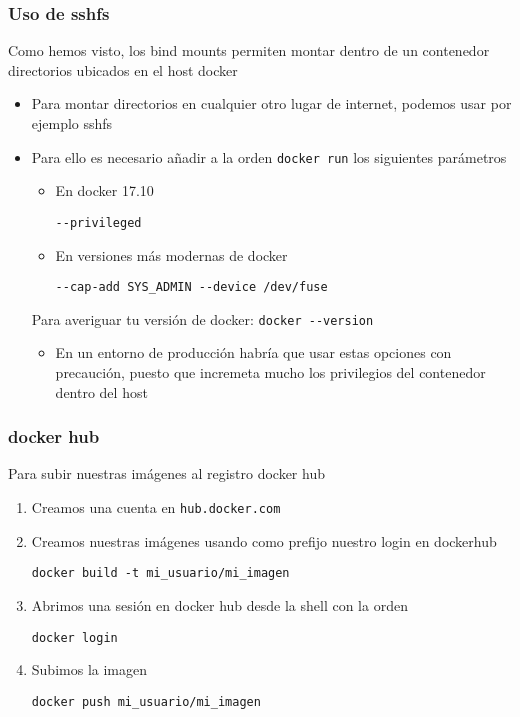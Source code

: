 \documentclass[ucs]{beamer}
\begin{document}
\begin{frame}[fragile]
\frametitle{Uso de sshfs}
Como hemos visto, los bind mounts permiten montar dentro de un
contenedor directorios ubicados en el host docker

\begin{itemize}
\item
Para montar directorios en cualquier otro lugar de internet, podemos usar
por ejemplo sshfs

\item
Para ello es necesario añadir a la orden 
\verb|docker run| los siguientes parámetros

\begin{itemize}
\item
En docker 17.10

\verb|--privileged|

\item
En versiones más modernas de  docker 

\verb|--cap-add SYS_ADMIN --device /dev/fuse|
\end{itemize}

Para averiguar tu versión de docker:
\verb|docker --version|



\begin{itemize}
\item
En un entorno de producción habría que usar estas opciones con precaución,
puesto que incremeta mucho los privilegios del contenedor dentro del host
\end{itemize}



\end{itemize}

\end{frame}




\begin{frame}[fragile]
\frametitle{docker hub}
Para subir nuestras imágenes al registro docker hub
\begin{enumerate}
\item
Creamos una cuenta en
\verb|hub.docker.com|

\item
Creamos nuestras imágenes usando como prefijo nuestro login en dockerhub


\verb|docker build -t mi_usuario/mi_imagen|

\item
Abrimos una sesión en docker hub desde la shell con la orden

\verb|docker login|


\item
Subimos la imagen

\verb|docker push mi_usuario/mi_imagen|

\end{enumerate}

\end{frame}
\end{document}
